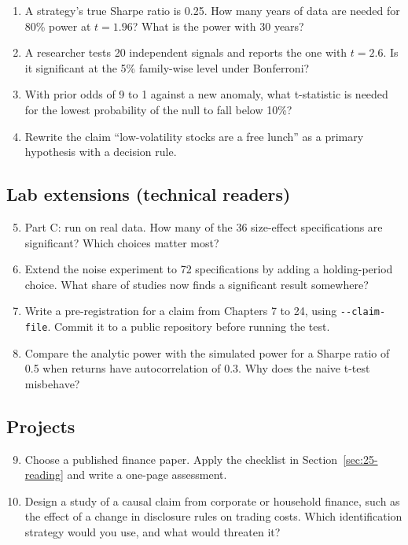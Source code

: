 \begin{enumerate}
  \item A strategy's true Sharpe ratio is 0.25. How many years of data are needed for 80\% power at $t = 1.96$? What is the power with 30 years?
  \item A researcher tests 20 independent signals and reports the one with $t = 2.6$. Is it significant at the 5\% family-wise level under Bonferroni?
  \item With prior odds of 9 to 1 against a new anomaly, what t-statistic is needed for the lowest probability of the null to fall below 10\%?
  \item Rewrite the claim ``low-volatility stocks are a free lunch'' as a primary hypothesis with a decision rule.
\end{enumerate}

\subsection*{Lab extensions (technical readers)}

\begin{enumerate}
  \setcounter{enumi}{4}
  \item Part C: run on real data. How many of the 36 size-effect specifications are significant? Which choices matter most?
  \item Extend the noise experiment to 72 specifications by adding a holding-period choice. What share of studies now finds a significant result somewhere?
  \item {\sloppy Write a pre-registration for a claim from Chapters 7 to 24, using \texttt{-{}-claim-file}. Commit it to a public repository before running the test.\par}
  \item Compare the analytic power with the simulated power for a Sharpe ratio of 0.5 when returns have autocorrelation of 0.3. Why does the naive t-test misbehave?
\end{enumerate}

\subsection*{Projects}

\begin{enumerate}
  \setcounter{enumi}{8}
  \item Choose a published finance paper. Apply the checklist in Section~\ref{sec:25-reading} and write a one-page assessment.
  \item Design a study of a causal claim from corporate or household finance, such as the effect of a change in disclosure rules on trading costs. Which identification strategy would you use, and what would threaten it?
\end{enumerate}

